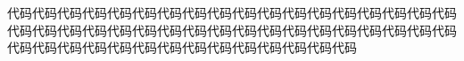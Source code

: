 \vspace*{12pt}
\centerline{\songti \textbf{}}
\vspace*{12pt}
{}
代码代码代码代码代码代码代码代码代码代码代码代码代码代码代码代码代码代码代码代码代码代码代码代码代码代码代码代码代码代码代码代码代码代码代码代码代码代码代码代码代码代码代码代码代码代码代码代码代码代码




